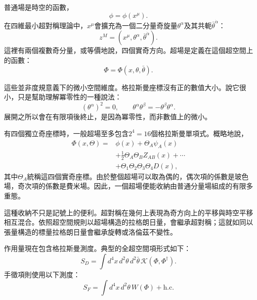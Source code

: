 普通場是時空的函數，
\begin{equation}
\phi=\phi(x^\mu).
\end{equation}
在四維最小超對稱理論中，\(x^\mu\)會擴充為一個二分量奇旋量\(\theta^\alpha\)及其共軛\(\bar\theta^{\dot\alpha}\)：
\begin{equation}
z^M=(x^\mu,\theta^\alpha,\bar\theta^{\dot\alpha}).
\end{equation}
這裡有兩個複數奇分量，或等價地說，四個實奇方向。超場是定義在這個超空間上的函數：
\begin{equation}
\Phi=\Phi(x,\theta,\bar\theta).
\end{equation}

這些並非度規意義下的微小空間維度。格拉斯曼座標沒有正的數值大小。說它很小，只是幫助理解冪零性的一種說法：
\begin{equation}
(\theta^\alpha)^2=0,
\qquad
\theta^\alpha\theta^\beta=-\theta^\beta\theta^\alpha.
\end{equation}
展開之所以會在有限項後終止，是因為冪零性，而非數值上的微小。\editorialnote{}

有四個獨立奇座標時，一般超場至多包含\(2^4=16\)個格拉斯曼單項式。概略地說，
\begin{equation}
\begin{aligned}
\Phi(x,\Theta)={}&\phi(x)+\Theta_A\psi_A(x)\\
&+\frac{1}{2}\Theta_A\Theta_B Z_{AB}(x)+\cdots\\
&+\Theta_1\Theta_2\Theta_3\Theta_4D(x),
\end{aligned}
\end{equation}
其中\(\Theta_A\)統稱這四個實奇座標。由於整個超場可以取為偶的，偶次項的係數是玻色場，奇次項的係數是費米場。因此，一個超場便能收納由普通分量場組成的有限多重態。

這種收納不只是記號上的便利。超對稱在幾何上表現為奇方向上的平移與時空平移相互混合。依照超空間規則以超場構造的拉格朗日量，會繼承超對稱；這就如同以張量構造的標量拉格朗日量會繼承旋轉或洛倫茲不變性。

作用量現在包含格拉斯曼測度。典型的全超空間項形式如下：
\begin{equation}
S_D=\int d^4x\,d^2\theta\,d^2\bar\theta\,
\mathcal K(\Phi,\Phi^\dagger).
\end{equation}
手徵項則使用以下測度：
\begin{equation}
S_F=\int d^4x\,d^2\theta\,W(\Phi)+\mathrm{h.c.}
\end{equation}

